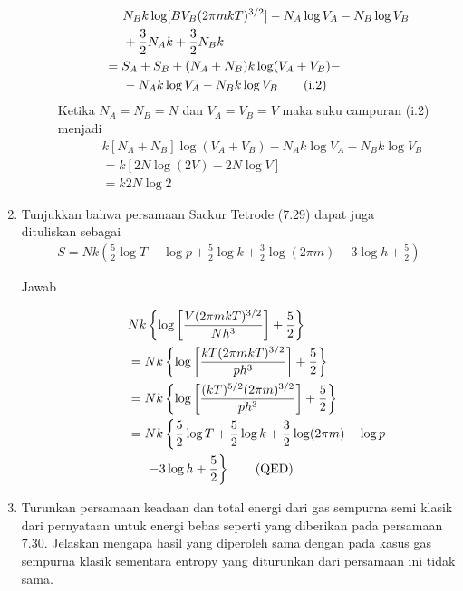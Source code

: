 \documentclass[a4paper , 12 pt]{article}
\begin{document}
\begin{enumerate}
\begin{description}
\begin{align}
	& \hspace{0.5 cm }N_B k \log [B V_B (2 \pi m kT)^{3/2}] - N_A \log V_A - N_B \log V_B \nonumber \\
	& \hspace{0.5 cm} +  \frac{3}{2}  N_A k + \frac{3}{2} N_B k \nonumber \\
	& = S_A + S_B + (N_A + N_B ) k \log (V_A + V_B) -  \nonumber \\
	& \hspace{0.5 cm } - N_A k \log V_A - N_B k \log V_B  \tag{i.2}
	\end{align}
	Ketika $N_A = N_B  = N$ dan $V_A = V_B = V$ maka suku campuran (i.2) menjadi
	\begin{align}
	& k [N_A + N_B] \log(V_A + V_B) -  N_A k \log V_A - N_B k \log V_B \nonumber \\
	 & = k [2 N \log (2V ) - 2 N \log V] \nonumber \\
	 & = k 2N \log 2 \tag{QED}
	\end{align}
	\end{description}
\item Tunjukkan bahwa persamaan Sackur Tetrode (7.29) dapat juga \\dituliskan sebagai  
\begin{align}
S = N k \left( \frac{5}{2}  \log T - \log p + \frac{5}{2} \log k +  \frac{3}{2} \log(2 \pi m) - 3 \log h \nonumber +\frac{5}{2}\right)
\end{align}
\begin{description}
\item[Jawab]
	\begin{align}
	& N k \left\{ \log \left[ \frac{V (2 \pi m k T)^{3/2} }{N h^3 }  \right] + \frac{5}{2}\right \} \nonumber \\
	& = N k \left \lbrace \log \left [ 
	\frac{k T (2 \pi m k T)^{3/2}}{p h^3}  \right ] +\frac{5}{2} \right \rbrace \nonumber \\
	& = N k \left \{  \log 
	  \left [ \frac{(kT)^{5/2} (2 \pi m)^{3/2}}{p h^3} \right ] + \frac{5}{2} \right   \} \nonumber \\
	  & = N k \left \{ \frac{5}{2}  \log T + \frac{5}{2} \log k + \frac{3}{2} \log (2\pi m ) - \log p   \right. \nonumber \\
	  & \hspace{0.5 cm } \left.  - 3 \log h + \frac{5}{2} \right \}  \tag{QED}
	\end{align}
\end{description}
\item Turunkan persamaan keadaan dan total energi dari gas sempurna semi klasik  dari pernyataan  untuk energi bebas seperti yang diberikan pada persamaan 7.30. Jelaskan mengapa hasil yang diperoleh  sama dengan pada kasus gas sempurna klasik sementara entropy yang diturunkan dari persamaan ini tidak sama. 

\end{enumerate}
\end{document}
